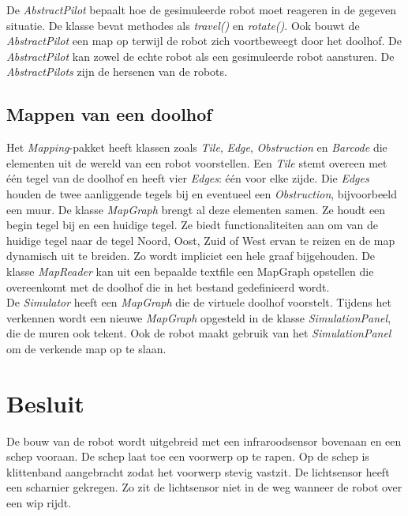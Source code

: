 \documentclass[tt2]{penoverslag}
\begin{document}
De \textit{AbstractPilot} bepaalt hoe de gesimuleerde robot moet reageren in de gegeven situatie. De klasse bevat methodes als \textit{travel()} en \textit{rotate()}. Ook bouwt de \textit{AbstractPilot} een map op terwijl de robot zich voortbeweegt door het doolhof. De \textit{AbstractPilot} kan zowel de echte robot als een gesimuleerde robot aansturen. De \textit{AbstractPilots} zijn de hersenen van de robots.

\subsection{Mappen van een doolhof} %
\label{ssec:mapping}
Het \textit{Mapping}-pakket heeft klassen zoals \textit{Tile}, \textit{Edge}, \textit{Obstruction} en \textit{Barcode} die elementen uit de wereld van een robot voorstellen. Een \textit{Tile} stemt overeen met \'e\'en tegel van de doolhof en heeft vier \textit{Edges}: \'e\'en voor elke zijde. Die \textit{Edges} houden de twee aanliggende tegels bij en eventueel een \textit{Obstruction}, bijvoorbeeld een muur. De klasse \textit{MapGraph} brengt al deze elementen samen. Ze houdt een begin tegel bij en een huidige tegel. Ze biedt functionaliteiten aan om van de huidige tegel naar de tegel Noord, Oost, Zuid of West ervan te reizen en de map dynamisch uit te breiden. Zo wordt impliciet een hele graaf bijgehouden. De klasse \textit{MapReader} kan uit een bepaalde textfile een MapGraph opstellen die overeenkomt met de doolhof die in het bestand gedefinieerd wordt.\\

De \textit{Simulator} heeft een \textit{MapGraph} die de virtuele doolhof voorstelt. Tijdens het verkennen wordt een nieuwe \textit{MapGraph} opgesteld in de klasse \textit{SimulationPanel}, die de muren ook tekent. Ook de robot maakt gebruik van het \textit{SimulationPanel} om de verkende map op te slaan.


\section{Besluit}
De bouw van de robot wordt uitgebreid met een infraroodsensor bovenaan en een schep vooraan. De schep laat toe een voorwerp op te rapen. Op de schep is klittenband aangebracht zodat het voorwerp stevig vastzit. De lichtsensor heeft een scharnier gekregen. Zo zit de lichtsensor niet in de weg wanneer de robot over een wip rijdt. \\
\end{document}
